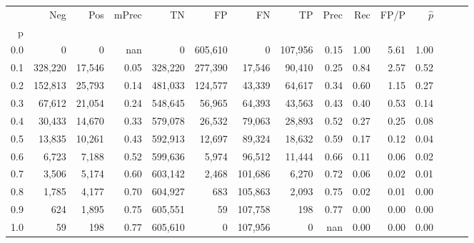 \begin{tabular}{rrrrrrrrrrrrrrr}
\toprule
{} &      Neg &     Pos & mPrec &       TN &       FP &       FN &       TP &  Prec &   Rec &  FP/P & $\hat{p}$ \\
p   &          &         &       &          &          &          &          &       &       &       &           \\
\midrule
0.0 &        0 &       0 &   nan &        0 &  605,610 &        0 &  107,956 &  0.15 &  1.00 &  5.61 &      1.00 \\
0.1 &  328,220 &  17,546 &  0.05 &  328,220 &  277,390 &   17,546 &   90,410 &  0.25 &  0.84 &  2.57 &      0.52 \\
0.2 &  152,813 &  25,793 &  0.14 &  481,033 &  124,577 &   43,339 &   64,617 &  0.34 &  0.60 &  1.15 &      0.27 \\
0.3 &   67,612 &  21,054 &  0.24 &  548,645 &   56,965 &   64,393 &   43,563 &  0.43 &  0.40 &  0.53 &      0.14 \\
0.4 &   30,433 &  14,670 &  0.33 &  579,078 &   26,532 &   79,063 &   28,893 &  0.52 &  0.27 &  0.25 &      0.08 \\
0.5 &   13,835 &  10,261 &  0.43 &  592,913 &   12,697 &   89,324 &   18,632 &  0.59 &  0.17 &  0.12 &      0.04 \\
0.6 &    6,723 &   7,188 &  0.52 &  599,636 &    5,974 &   96,512 &   11,444 &  0.66 &  0.11 &  0.06 &      0.02 \\
0.7 &    3,506 &   5,174 &  0.60 &  603,142 &    2,468 &  101,686 &    6,270 &  0.72 &  0.06 &  0.02 &      0.01 \\
0.8 &    1,785 &   4,177 &  0.70 &  604,927 &      683 &  105,863 &    2,093 &  0.75 &  0.02 &  0.01 &      0.00 \\
0.9 &      624 &   1,895 &  0.75 &  605,551 &       59 &  107,758 &      198 &  0.77 &  0.00 &  0.00 &      0.00 \\
1.0 &       59 &     198 &  0.77 &  605,610 &        0 &  107,956 &        0 &   nan &  0.00 &  0.00 &      0.00 \\
\bottomrule
\end{tabular}
